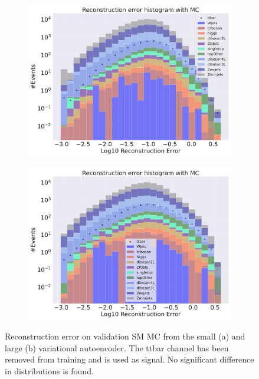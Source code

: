 \begin{figure}[H]
    \centering
    \begin{subfigure}{.45\textwidth}
        \includegraphics[width=\textwidth]{Figures/VAE_testing/small/b_data_recon_big_rm3_feats_sig_ttbar.pdf}
        \caption{}
        \label{fig:vae_small_ttbar}
    \end{subfigure}
    \hfill 
    \begin{subfigure}{.45\textwidth}
        \includegraphics[width=\textwidth]{Figures/VAE_testing/big/b_data_recon_big_rm3_feats_sig_ttbar.pdf}
        \caption{ }
        \label{fig:vae_big_ttbar}
    \end{subfigure}
    \hfill 
    \caption[VAE | Reconstruction error using ttbar channel as signal]{Reconstruction error on validation SM MC from the small (a) and large (b) variational autoencoder. The ttbar channel has been removed from training and 
    is used as signal. No significant difference in distributions is found.  }
    \label{fig:vae_big_channel_3}
\end{figure} 
